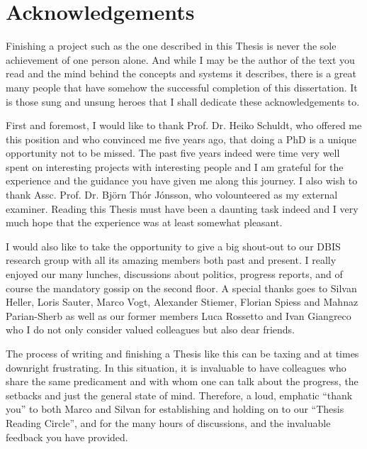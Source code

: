 
\chapter{Acknowledgements}

Finishing a project such as the one described in this Thesis is never the sole achievement of one person alone. And while I may be the author of the text you read and the mind behind the concepts and systems it describes, there is a great many people that have somehow the successful completion of this dissertation. It is those sung and unsung heroes that I shall dedicate these acknowledgements to.

First and foremost, I would like to thank Prof. Dr. Heiko Schuldt, who offered me this position and who convinced me five years ago, that doing a PhD is a unique opportunity not to be missed. The past five years indeed were time very well spent on interesting projects with interesting people and I am grateful for the experience and the guidance you have given me along this journey. I also wish to thank Assc. Prof. Dr. Björn Thór Jónsson, who volounteered as my external examiner. Reading this Thesis must have been a daunting task indeed and I very much hope that the experience was at least somewhat pleasant.

I would also like to take the opportunity to give a big shout-out to our DBIS research group with all its amazing members both past and present. I really enjoyed our many lunches, discussions about politics, progress reports, and of course the mandatory gossip on the second floor. A special thanks goes to Silvan Heller, Loris Sauter, Marco Vogt, Alexander Stiemer, Florian Spiess and Mahnaz Parian-Sherb as well as our former members Luca Rossetto and Ivan Giangreco who I do not only consider valued colleagues but also dear friends.  

The process of writing and finishing a Thesis like this can be taxing and at times downright frustrating. In this situation, it is invaluable to have colleagues who share the same predicament and with whom one can talk about the progress, the setbacks and just the general state of mind. Therefore, a loud, emphatic ``thank you'' to both Marco and Silvan for establishing and holding on to our ``Thesis Reading Circle'', and for the many hours of discussions, and the invaluable feedback you have provided.

